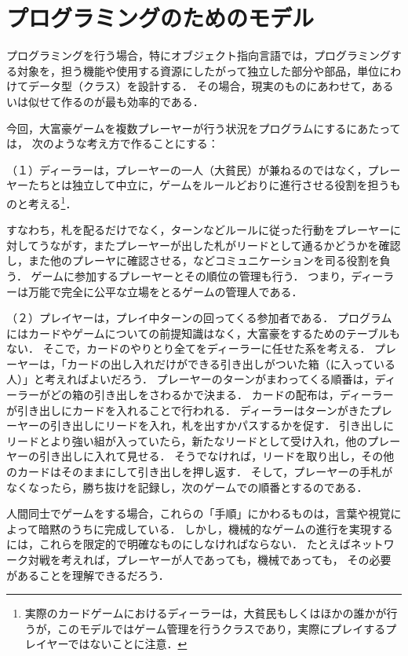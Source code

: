 \section{プログラミングのためのモデル}
プログラミングを行う場合，特にオブジェクト指向言語では，プログラミングする対象を，担う機能や使用する資源にしたがって独立した部分や部品，単位にわけてデータ型（クラス）を設計する．
その場合，現実のものにあわせて，あるいは似せて作るのが最も効率的である．

今回，大富豪ゲームを複数プレーヤーが行う状況をプログラムにするにあたっては，
次のような考え方で作ることにする：

（１）ディーラーは，プレーヤーの一人（大貧民）が兼ねるのではなく，プレーヤーたちとは独立して中立に，ゲームをルールどおりに進行させる役割を担うものと考える\footnote{実際のカードゲームにおけるディーラーは，大貧民もしくはほかの誰かが行うが，このモデルではゲーム管理を行うクラスであり，実際にプレイするプレイヤーではないことに注意．}．

すなわち，札を配るだけでなく，ターンなどルールに従った行動をプレーヤーに対してうながす，またプレーヤーが出した札がリードとして通るかどうかを確認し，また他のプレーヤに確認させる，などコミュニケーションを司る役割を負う．
ゲームに参加するプレーヤーとその順位の管理も行う．
つまり，ディーラーは万能で完全に公平な立場をとるゲームの管理人である．

（２）プレイヤーは，プレイ中ターンの回ってくる参加者である．
プログラムにはカードやゲームについての前提知識はなく，大富豪をするためのテーブルもない．
そこで，カードのやりとり全てをディーラーに任せた系を考える．
プレーヤーは，「カードの出し入れだけができる引き出しがついた箱（に入っている人）」と考えればよいだろう．
プレーヤーのターンがまわってくる順番は，ディーラーがどの箱の引き出しをさわるかで決まる．
カードの配布は，ディーラーが引き出しにカードを入れることで行われる．
ディーラーはターンがきたプレーヤーの引き出しにリードを入れ，札を出すかパスするかを促す．
引き出しにリードとより強い組が入っていたら，新たなリードとして受け入れ，他のプレーヤーの引き出しに入れて見せる．
そうでなければ，リードを取り出し，その他のカードはそのままにして引き出しを押し返す．
そして，プレーヤーの手札がなくなったら，勝ち抜けを記録し，次のゲームでの順番とするのである．

人間同士でゲームをする場合，これらの「手順」にかわるものは，言葉や視覚によって暗黙のうちに完成している．
しかし，機械的なゲームの進行を実現するには，これらを限定的で明確なものにしなければならない．
たとえばネットワーク対戦を考えれば，プレーヤーが人であっても，機械であっても，
その必要があることを理解できるだろう．


